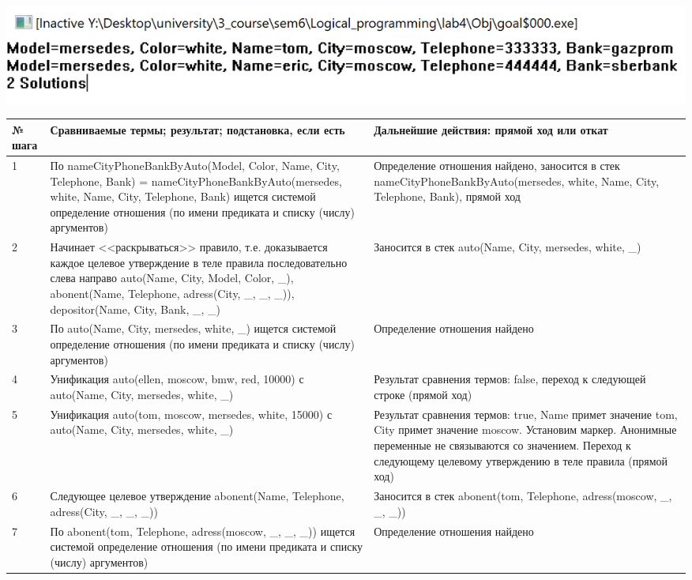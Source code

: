 \documentclass[a4paper,14pt]{extreport} %
\begin{document}
\includegraphics[scale=0.8]{ex1}

\begin{longtable}{|p{1.1cm}|p{8.5cm}|p{7cm}|}
	\hline
 	№ шага & Сравниваемые термы; результат; подстановка, если есть  & Дальнейшие действия: прямой ход или откат \\ \hline
	1 & По nameCityPhoneBankByAuto(Model, Color, Name, City, Telephone, Bank) = nameCityPhoneBankByAuto(mersedes, white, Name, City, Telephone, Bank) ищется системой определение отношения (по имени предиката и списку (числу) аргументов) & Определение отношения найдено, заносится в стек nameCityPhoneBankByAuto(mersedes, white, Name, City, Telephone, Bank), прямой ход \\ \hline
	2 & Начинает <<раскрываться>> правило, т.е. доказывается каждое целевое утверждение в теле правила последовательно слева направо
	auto(Name, City, Model, Color, \_),
    abonent(Name, Telephone, adress(City, \_, \_, \_)),
    depositor(Name, City, Bank, \_, \_)
	
	& Заносится в стек auto(Name, City, mersedes, white, \_) \\ \hline

	3 & По auto(Name, City, mersedes, white, \_)  ищется системой определение отношения (по имени предиката и списку (числу) аргументов) & Определение отношения найдено \\ \hline
	4 & Унификация auto(ellen, moscow, bmw, red, 10000) с auto(Name, City, mersedes, white, \_) & Результат сравнения термов: false, переход к следующей строке (прямой ход) \\ \hline
	5 & Унификация auto(tom, moscow, mersedes, white, 15000) с auto(Name, City, mersedes, white, \_)  & Результат сравнения термов: true, Name примет значение tom, City примет значение moscow. Установим маркер.  Анонимные переменные не связываются со значением. Переход к следующему целевому утверждению в теле правила (прямой ход) \\ \hline
	
	6 & Следующее целевое утверждение abonent(Name, Telephone, adress(City, \_, \_, \_)) & Заносится в стек abonent(tom, Telephone, adress(moscow, \_, \_, \_))   \\ \hline
	7 & По abonent(tom, Telephone, adress(moscow, \_, \_, \_))  ищется системой определение отношения (по имени предиката и списку (числу) аргументов) & Определение отношения найдено \\ \hline
	

\end{longtable}
\end{document}
